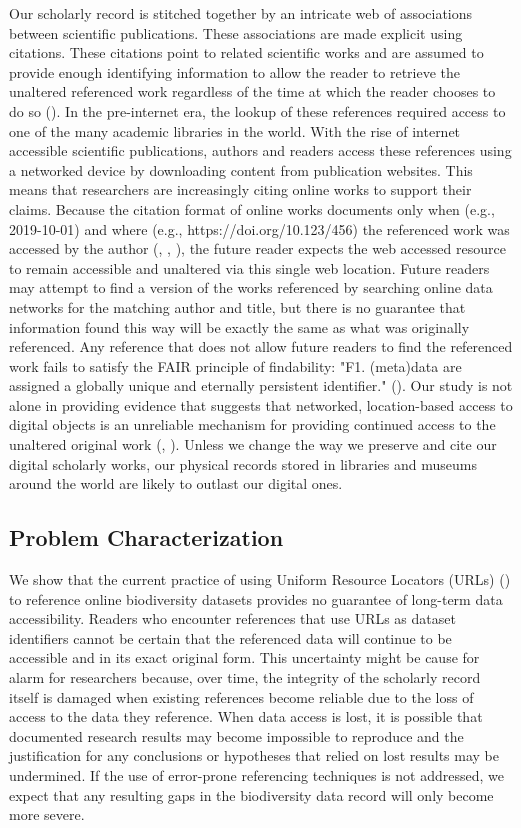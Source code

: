 \documentclass[10pt,letterpaper]{article}
\begin{document}
Our scholarly record is stitched together by an intricate web of associations between scientific publications. These associations are made explicit using citations. These citations point to related scientific works and are assumed to provide enough identifying information to allow the reader to retrieve the unaltered referenced work regardless of the time at which the reader chooses to do so (\cite{Garfield_1964}). In the pre-internet era, the lookup of these references required access to one of the many academic libraries in the world. With the rise of internet accessible scientific publications, authors and readers access these references using a networked device by downloading content from publication websites. This means that researchers are increasingly citing online works to support their claims. Because the citation format of online works documents only when (e.g., 2019-10-01) and where (e.g., https://doi.org/10.123/456) the referenced work was accessed by the author (\cite{gbif_2019}, \cite{idigbio_2016}, \cite{dataone_2012}), the future reader expects the web accessed resource to remain accessible and unaltered via this single web location. Future readers may attempt to find a version of the works referenced by searching online data networks for the matching author and title, but there is no guarantee that information found this way will be exactly the same as what was originally referenced. Any reference that does not allow future readers to find the referenced work fails to satisfy the FAIR principle of findability: "F1. (meta)data are assigned a globally unique and eternally persistent identifier." (\cite{Wilkinson_2016}). Our study is not alone in providing evidence that suggests that networked, location-based access to digital objects is an unreliable mechanism for providing continued access to the unaltered original work (\cite{Vision_2010}, \cite{Klein_2014}). Unless we change the way we preserve and cite our digital scholarly works, our physical records stored in libraries and museums around the world are likely to outlast our digital ones.

\subsection*{Problem Characterization}
We show that the current practice of using Uniform Resource Locators (URLs) (\cite{rfc1738}) to reference online biodiversity datasets provides no guarantee of long-term data accessibility.  Readers who encounter references that use URLs as dataset identifiers cannot be certain that the referenced data will continue to be accessible and in its exact original form. This uncertainty might be cause for alarm for researchers because, over time, the integrity of the scholarly record itself is damaged when existing references become reliable due to the loss of access to the data they reference. When data access is lost, it is possible that documented research results may become impossible to reproduce and the justification for any conclusions or hypotheses that relied on lost results may be undermined. If the use of error-prone referencing techniques is not addressed, we expect that any resulting gaps in the biodiversity data record will only become more severe.
\end{document}
